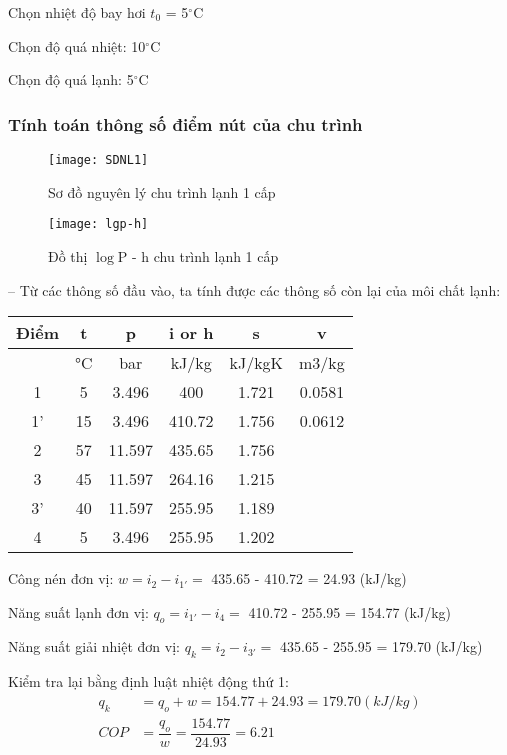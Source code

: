 \begin{table}[H]
Chọn nhiệt độ bay hơi $t_{0}$ = 5$^{\circ}$C

Chọn độ quá nhiệt: 10$^{\circ}$C

Chọn độ quá lạnh: 5$^{\circ}$C

\subsubsection{Tính toán thông số điểm nút của chu trình}
\begin{figure}[H]
	\centering
	\texttt{[image: SDNL1]}
	\caption{Sơ đồ nguyên lý chu trình lạnh 1 cấp}
	\texttt{[image: lgp-h]}
	\caption{Đồ thị $\log$P - h chu trình lạnh 1 cấp}
\end{figure}

-- Từ các thông số đầu vào, ta tính được các thông số còn lại của môi chất lạnh:

\begin{table}[H]
	\vspace{0.5cm}
	\centering
	
	\begin{tabular}{|c|c|c|c|c|c|}
		\hline
		Điểm  & t     & p     & i or h & s     & v \bigstrut\\
		\hline
		& °C    & bar   & kJ/kg & kJ/kgK & m3/kg \bigstrut\\
		\hline
		1     & 5     & 3.496 & 400   & 1.721 & 0.0581 \bigstrut\\
		\hline
		1'    & 15    & 3.496 & 410.72 & 1.756 & 0.0612 \bigstrut\\
		\hline
		2     & 57    & 11.597 & 435.65 & 1.756 &  \bigstrut\\
		\hline
		3     & 45    & 11.597 & 264.16 & 1.215 &  \bigstrut\\
		\hline
		3'    & 40    & 11.597 & 255.95 & 1.189 &  \bigstrut\\
		\hline
		4     & 5     & 3.496 & 255.95 & 1.202 &  \bigstrut\\
		\hline
	\end{tabular}%
\end{table}

Công nén đơn vị: $w = i_{2} - i_{1'} = $ 435.65 - 410.72 = 24.93 (kJ/kg)

Năng suất lạnh đơn vị: $q_{o} = i_{1'} - i_{4} = $ 410.72 - 255.95 = 154.77 (kJ/kg)

Năng suất giải nhiệt đơn vị: $q_{k} = i_{2} - i_{3'} = $ 435.65 - 255.95 = 179.70 (kJ/kg)

Kiểm tra lại bằng định luật nhiệt động thứ 1:
\begin{equation*}
	\begin{split}
		q_{k} &= q_{o} + w = 154.77 + 24.93 = 179.70 (kJ/kg)\\	
		COP &= \dfrac{q_{o}}{w} = \dfrac{154.77}{24.93} = 6.21
	\end{split}
\end{equation*}


\end{table}

